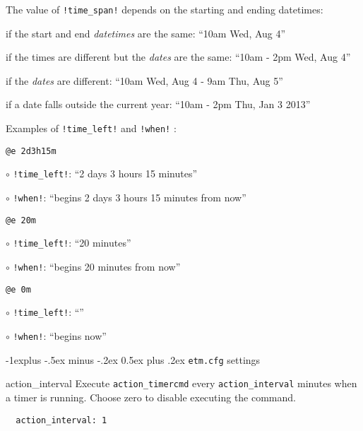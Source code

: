 \documentclass[9pt,landscape]{article}
\makeatletter
\renewcommand{\subsection}{\@startsection{subsection}{2}{0mm}%
                                {-1explus -.5ex minus -.2ex}%
                                {0.5ex plus .2ex}%
                                {\normalfont\normalsize\bfseries}}
\makeatother
\begin{document}
\begin{multicols}{3}
\vskip3pt
The value of \verb'!time_span!' depends on the starting and ending datetimes:
\begin{compactitem}
\item if the start and end \emph{datetimes} are the same: ``10am Wed, Aug 4''
\item if the times are different but the \emph{dates} are the same: ``10am - 2pm Wed, Aug 4''
\item if the \emph{dates} are different: ``10am Wed, Aug 4 - 9am Thu, Aug 5''
\item if a date falls outside the current year: ``10am - 2pm Thu, Jan 3 2013''
\end{compactitem}

Examples of \verb'!time_left!' and \verb'!when!' :
\begin{compactitem}
\item \verb!@e 2d3h15m!
    \begin{compactitem}
        \item[$\circ$] \verb'!time_left!': ``2 days 3 hours 15 minutes''
        \item[$\circ$] \verb'!when!': ``begins 2 days 3 hours 15 minutes from now''
    \end{compactitem}
\item \verb!@e 20m!
    \begin{compactitem}
        \item[$\circ$] \verb'!time_left!': ``20 minutes''
        \item[$\circ$] \verb'!when!': ``begins 20 minutes from now''
    \end{compactitem}
\item \verb!@e 0m!
    \begin{compactitem}
        \item[$\circ$] \verb'!time_left!': ``''
        \item[$\circ$] \verb'!when!': ``begins now''
    \end{compactitem}
\end{compactitem}

\subsection{\texttt{etm.cfg} settings}

\begin{compactdesc}
\item[action\_interval] Execute \verb'action_timercmd' every \verb'action_interval' minutes when a timer is running. Choose zero to disable executing the command.
\begin{verbatim}
  action_interval: 1
\end{verbatim}


\end{compactdesc}
\end{multicols}
\end{document}
